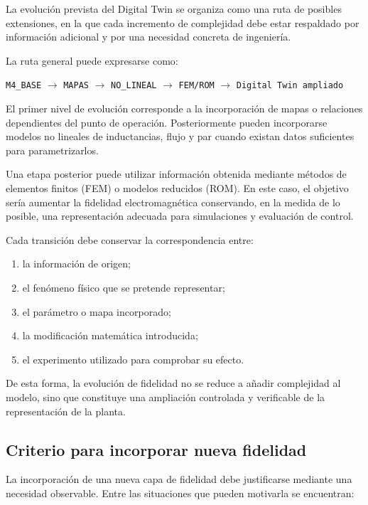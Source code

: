 La evolución prevista del Digital Twin se organiza como una ruta de posibles extensiones, en la que cada incremento de complejidad debe estar respaldado por información adicional y por una necesidad concreta de ingeniería.

La ruta general puede expresarse como:

\begin{center}
\texttt{M4\_BASE}
$\rightarrow$
\texttt{MAPAS}
$\rightarrow$
\texttt{NO\_LINEAL}
$\rightarrow$
\texttt{FEM/ROM}
$\rightarrow$
\texttt{Digital Twin ampliado}
\end{center}

El primer nivel de evolución corresponde a la incorporación de mapas o relaciones dependientes del punto de operación. Posteriormente pueden incorporarse modelos no lineales de inductancias, flujo y par cuando existan datos suficientes para parametrizarlos.

Una etapa posterior puede utilizar información obtenida mediante métodos de elementos finitos (FEM) o modelos reducidos (ROM). En este caso, el objetivo sería aumentar la fidelidad electromagnética conservando, en la medida de lo posible, una representación adecuada para simulaciones y evaluación de control.

Cada transición debe conservar la correspondencia entre:

\begin{enumerate}
\item la información de origen;
\item el fenómeno físico que se pretende representar;
\item el parámetro o mapa incorporado;
\item la modificación matemática introducida;
\item el experimento utilizado para comprobar su efecto.
\end{enumerate}

De esta forma, la evolución de fidelidad no se reduce a añadir complejidad al modelo, sino que constituye una ampliación controlada y verificable de la representación de la planta.

\subsection{Criterio para incorporar nueva fidelidad}

La incorporación de una nueva capa de fidelidad debe justificarse mediante una necesidad observable. Entre las situaciones que pueden motivarla se encuentran:


